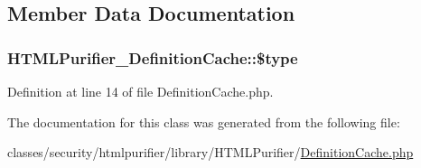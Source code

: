 \subsection{Member Data Documentation}
\hypertarget{classHTMLPurifier__DefinitionCache_a0c80a1c08a20940de796f4ef29feefbc}{
\subsubsection[{\$type}]{\setlength{\rightskip}{0pt plus 5cm}H\+T\+M\+L\+Purifier\+\_\+\+Definition\+Cache\+::\$type}}\label{classHTMLPurifier__DefinitionCache_a0c80a1c08a20940de796f4ef29feefbc}


Definition at line 14 of file Definition\+Cache.\+php.



The documentation for this class was generated from the following file\+:\begin{DoxyCompactItemize}
\item 
classes/security/htmlpurifier/library/\+H\+T\+M\+L\+Purifier/\hyperlink{DefinitionCache_8php}{Definition\+Cache.\+php}\end{DoxyCompactItemize}
